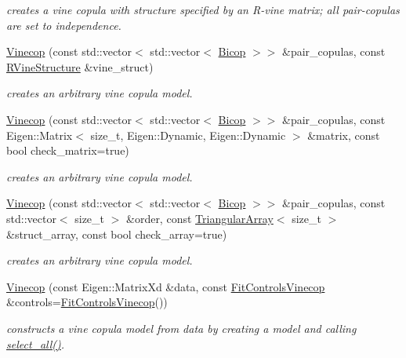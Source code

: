 \begin{DoxyCompactItemize}
\begin{DoxyCompactList}\small\item\em creates a vine copula with structure specified by an R-\/vine matrix; all pair-\/copulas are set to independence. \end{DoxyCompactList}\item 
\hyperlink{classvinecopulib_1_1_vinecop_a6f41f3f14cd479a62bef7448c00376d0}{Vinecop} (const std\+::vector$<$ std\+::vector$<$ \hyperlink{classvinecopulib_1_1_bicop}{Bicop} $>$$>$ \&pair\+\_\+copulas, const \hyperlink{classvinecopulib_1_1_r_vine_structure}{R\+Vine\+Structure} \&vine\+\_\+struct)
\begin{DoxyCompactList}\small\item\em creates an arbitrary vine copula model. \end{DoxyCompactList}\item 
\hyperlink{classvinecopulib_1_1_vinecop_abc94737980ef5dbdc16b7d0aa66e683d}{Vinecop} (const std\+::vector$<$ std\+::vector$<$ \hyperlink{classvinecopulib_1_1_bicop}{Bicop} $>$$>$ \&pair\+\_\+copulas, const Eigen\+::\+Matrix$<$ size\+\_\+t, Eigen\+::\+Dynamic, Eigen\+::\+Dynamic $>$ \&matrix, const bool check\+\_\+matrix=true)
\begin{DoxyCompactList}\small\item\em creates an arbitrary vine copula model. \end{DoxyCompactList}\item 
\hyperlink{classvinecopulib_1_1_vinecop_ae15da62d7cd3829bbd2980fe4ac190b0}{Vinecop} (const std\+::vector$<$ std\+::vector$<$ \hyperlink{classvinecopulib_1_1_bicop}{Bicop} $>$$>$ \&pair\+\_\+copulas, const std\+::vector$<$ size\+\_\+t $>$ \&order, const \hyperlink{classvinecopulib_1_1_triangular_array}{Triangular\+Array}$<$ size\+\_\+t $>$ \&struct\+\_\+array, const bool check\+\_\+array=true)
\begin{DoxyCompactList}\small\item\em creates an arbitrary vine copula model. \end{DoxyCompactList}\item 
\hyperlink{classvinecopulib_1_1_vinecop_a8b389e32ae8d1a2c26046a6be19040f0}{Vinecop} (const Eigen\+::\+Matrix\+Xd \&data, const \hyperlink{classvinecopulib_1_1_fit_controls_vinecop}{Fit\+Controls\+Vinecop} \&controls=\hyperlink{classvinecopulib_1_1_fit_controls_vinecop}{Fit\+Controls\+Vinecop}())
\begin{DoxyCompactList}\small\item\em constructs a vine copula model from data by creating a model and calling \hyperlink{classvinecopulib_1_1_vinecop_a0d2fae568f3d893c1c144a8034fbaf90}{select\+\_\+all()}. \end{DoxyCompactList}\item 
$$
\end{DoxyCompactItemize}
